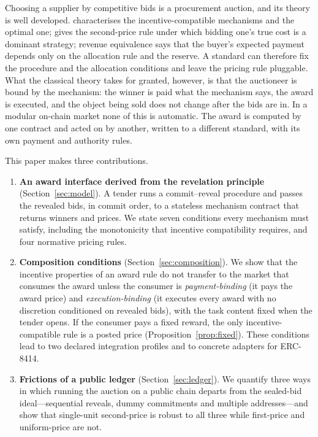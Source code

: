 \documentclass[11pt]{article}
\theoremstyle{definition}
\theoremstyle{remark}
\begin{document}
Choosing a supplier by competitive bids is a procurement auction, and its theory is well developed. \citet{myerson1981} characterises the incentive-compatible mechanisms and the optimal one; \citet{vickrey1961} gives the second-price rule under which bidding one's true cost is a dominant strategy; revenue equivalence \citep{myerson1981,riley1981} says that the buyer's expected payment depends only on the allocation rule and the reserve. A standard can therefore fix the procedure and the allocation conditions and leave the pricing rule pluggable. What the classical theory takes for granted, however, is that the auctioneer is bound by the mechanism: the winner is paid what the mechanism says, the award is executed, and the object being sold does not change after the bids are in. In a modular on-chain market none of this is automatic. The award is computed by one contract and acted on by another, written to a different standard, with its own payment and authority rules.

This paper makes three contributions.

\begin{enumerate}[leftmargin=*,itemsep=2pt]
\item \textbf{An award interface derived from the revelation principle} (Section~\ref{sec:model}). A tender runs a commit--reveal procedure and passes the revealed bids, in commit order, to a stateless mechanism contract that returns winners and prices. We state seven conditions every mechanism must satisfy, including the monotonicity that incentive compatibility requires, and four normative pricing rules.
\item \textbf{Composition conditions} (Section~\ref{sec:composition}). We show that the incentive properties of an award rule do not transfer to the market that consumes the award unless the consumer is \emph{payment-binding} (it pays the award price) and \emph{execution-binding} (it executes every award with no discretion conditioned on revealed bids), with the task content fixed when the tender opens. If the consumer pays a fixed reward, the only incentive-compatible rule is a posted price (Proposition~\ref{prop:fixed}). These conditions lead to two declared integration profiles and to concrete adapters for ERC-8414.
\item \textbf{Frictions of a public ledger} (Section~\ref{sec:ledger}). We quantify three ways in which running the auction on a public chain departs from the sealed-bid ideal---sequential reveals, dummy commitments and multiple addresses---and show that single-unit second-price is robust to all three while first-price and uniform-price are not.
\end{enumerate}
\end{document}
